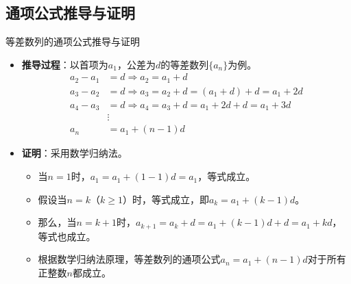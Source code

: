 \documentclass[aspectratio=169]{ctexbeamer} %
\begin{document}
\subsection{通项公式推导与证明}
\begin{frame}{等差数列的通项公式推导与证明}
\begin{itemize}
\item \textbf{推导过程}：以首项为$a_1$，公差为$d$的等差数列$\{a_n\}$为例。
\begin{align*}
a_2 - a_1 &= d \Rightarrow a_2 = a_1 + d \\
a_3 - a_2 &= d \Rightarrow a_3 = a_2 + d = (a_1 + d) + d = a_1 + 2d \\
a_4 - a_3 &= d \Rightarrow a_4 = a_3 + d = a_1 + 2d + d = a_1 + 3d \\
&\vdots \\
a_n &= a_1 + (n - 1)d
\end{align*}
\item \textbf{证明}：采用数学归纳法。
\begin{itemize}
\item 当$n = 1$时，$a_1 = a_1 + (1 - 1)d = a_1$，等式成立。
\item 假设当$n = k$（$k \geq 1$）时，等式成立，即$a_k = a_1 + (k - 1)d$。
\item 那么，当$n = k + 1$时，$a_{k+1} = a_k + d = a_1 + (k - 1)d + d = a_1 + k d$，等式也成立。
\item 根据数学归纳法原理，等差数列的通项公式$a_n = a_1 + (n - 1)d$对于所有正整数$n$都成立。
\end{itemize}
\end{itemize}
\end{frame}
\end{document}
